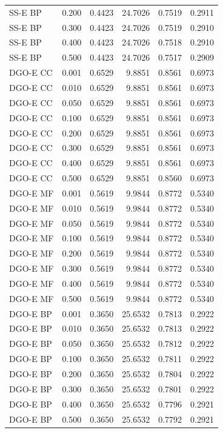 \begin{longtable}{lrrrrr}
SS-E BP & 0.200 & 0.4423 & 24.7026 & 0.7519 & 0.2911 \\
SS-E BP & 0.300 & 0.4423 & 24.7026 & 0.7519 & 0.2910 \\
SS-E BP & 0.400 & 0.4423 & 24.7026 & 0.7518 & 0.2910 \\
SS-E BP & 0.500 & 0.4423 & 24.7026 & 0.7517 & 0.2909 \\
DGO-E CC & 0.001 & 0.6529 & 9.8851 & 0.8561 & 0.6973 \\
DGO-E CC & 0.010 & 0.6529 & 9.8851 & 0.8561 & 0.6973 \\
DGO-E CC & 0.050 & 0.6529 & 9.8851 & 0.8561 & 0.6973 \\
DGO-E CC & 0.100 & 0.6529 & 9.8851 & 0.8561 & 0.6973 \\
DGO-E CC & 0.200 & 0.6529 & 9.8851 & 0.8561 & 0.6973 \\
DGO-E CC & 0.300 & 0.6529 & 9.8851 & 0.8561 & 0.6973 \\
DGO-E CC & 0.400 & 0.6529 & 9.8851 & 0.8561 & 0.6973 \\
DGO-E CC & 0.500 & 0.6529 & 9.8851 & 0.8560 & 0.6973 \\
DGO-E MF & 0.001 & 0.5619 & 9.9844 & 0.8772 & 0.5340 \\
DGO-E MF & 0.010 & 0.5619 & 9.9844 & 0.8772 & 0.5340 \\
DGO-E MF & 0.050 & 0.5619 & 9.9844 & 0.8772 & 0.5340 \\
DGO-E MF & 0.100 & 0.5619 & 9.9844 & 0.8772 & 0.5340 \\
DGO-E MF & 0.200 & 0.5619 & 9.9844 & 0.8772 & 0.5340 \\
DGO-E MF & 0.300 & 0.5619 & 9.9844 & 0.8772 & 0.5340 \\
DGO-E MF & 0.400 & 0.5619 & 9.9844 & 0.8772 & 0.5340 \\
DGO-E MF & 0.500 & 0.5619 & 9.9844 & 0.8772 & 0.5340 \\
DGO-E BP & 0.001 & 0.3650 & 25.6532 & 0.7813 & 0.2922 \\
DGO-E BP & 0.010 & 0.3650 & 25.6532 & 0.7813 & 0.2922 \\
DGO-E BP & 0.050 & 0.3650 & 25.6532 & 0.7812 & 0.2922 \\
DGO-E BP & 0.100 & 0.3650 & 25.6532 & 0.7811 & 0.2922 \\
DGO-E BP & 0.200 & 0.3650 & 25.6532 & 0.7804 & 0.2922 \\
DGO-E BP & 0.300 & 0.3650 & 25.6532 & 0.7801 & 0.2922 \\
DGO-E BP & 0.400 & 0.3650 & 25.6532 & 0.7796 & 0.2921 \\
DGO-E BP & 0.500 & 0.3650 & 25.6532 & 0.7792 & 0.2921 \\

\end{longtable}
